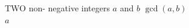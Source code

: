 \documentclass{article}
\begin{document}
\begin{algorithm}[H]
\caption{Euclid's algorithm}
TWO non- negative integers $a$ and $b$
{$\gcd(a,b) $}\\
\Return $a$ \;
\end{algorithm}
\end{document}
